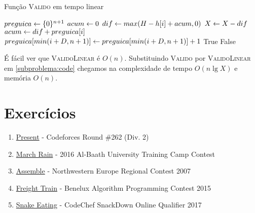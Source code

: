 \begin{algorithm}[H]
\caption{Função \textsc{Valido} em tempo linear}
\label{subproblema:code_linear}
\begin{algorithmic}[1]
    \State $preguica \leftarrow \{0\}^{n + 1}$
    \State $acum \leftarrow 0$
        \State $dif \leftarrow max(H - h[i] + acum, 0)$
        \State $X \leftarrow X - dif$
        \State $acum \leftarrow dif + preguica[i]$
        \State $preguica[min(i + D, n + 1)] \leftarrow preguica[min(i + D, n + 1)] + 1$
    \EndFor
        \State \Return True
    \Else
        \State \Return False
    \EndIf
\EndFunction
\end{algorithmic}
\end{algorithm}

É fácil ver que \textsc{ValidoLinear} é $O(n)$. Substituindo \textsc{Valido} por \textsc{ValidoLinear} em \ref{subproblema:code} chegamos na complexidade de tempo $O(n \lg X)$ e memória $O(n)$.

\section{Exercícios}

\begin{enumerate}
  \item \href{https://codeforces.com/problemset/problem/460/C}{Present} - Codeforces Round \#262 (Div. 2)
  \item \href{https://codeforces.com/problemset/gymProblem/101028/I}{March Rain} - 2016 Al-Baath University Training Camp Contest
  \item \href{https://icpcarchive.ecs.baylor.edu/index.php?option=com_onlinejudge&Itemid=8&page=show_problem&problem=1972}{Assemble} - Northwestern Europe Regional Contest 2007
  \item \href{https://open.kattis.com/problems/freighttrain}{Freight Train} - Benelux Algorithm Programming Contest 2015
  \item \href{https://www.codechef.com/problems/SNAKEEAT}{Snake Eating} - CodeChef SnackDown Online Qualifier 2017
\end{enumerate}
